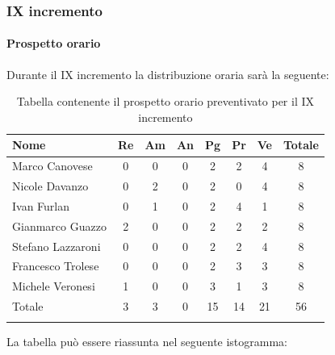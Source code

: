 \subsubsection{IX incremento}
\paragraph{Prospetto orario}
Durante il IX incremento la distribuzione oraria sarà la seguente:

\begin{longtable}{|l|c|c|c|c|c|c|c|}
	\hline
	\rowcolor{lighter-grayer}
	\textbf{Nome}     & \textbf{Re} & \textbf{Am} & \textbf{An} & \textbf{Pg} & \textbf{Pr} & \textbf{Ve} & \textbf{Totale} \\
	\hline
	\endfirsthead

	\hline
	Marco Canovese    & 0           & 0           & 0           & 2           & 2           & 4           & 8               \\
	\hline
	\hline
	Nicole Davanzo    & 0           & 2           & 0           & 2           & 0           & 4           & 8               \\
	\hline
	\hline
	Ivan Furlan       & 0           & 1           & 0           & 2           & 4           & 1           & 8               \\
	\hline
	\hline
	Gianmarco Guazzo  & 2           & 0           & 0           & 2           & 2           & 2           & 8               \\
	\hline
	\hline
	Stefano Lazzaroni & 0           & 0           & 0           & 2           & 2           & 4           & 8               \\
	\hline
	\hline
	Francesco Trolese & 0           & 0           & 0           & 2           & 3           & 3           & 8               \\
	\hline
	\hline
	Michele Veronesi  & 1           & 0           & 0           & 3           & 1           & 3           & 8               \\
	\hline
	\hline
	Totale            & 3           & 3          & 0          & 15           & 14           & 21          & 56              \\
	\hline
	\rowcolor{white}
	\caption{Tabella contenente il prospetto orario preventivato per il IX incremento}
\end{longtable}


La tabella può essere riassunta nel seguente istogramma:

